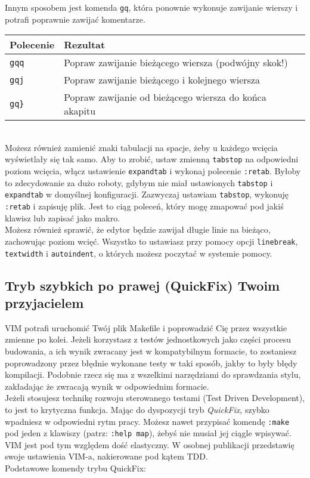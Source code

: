 \documentclass[a4paper,12pt]{article}
\begin{document}
\noindent
Innym sposobem jest komenda {\tt gq}, która ponownie wykonuje zawijanie wierszy i potrafi poprawnie zawijać komentarze.

\begin{tabular}{ l | p{} }
{\bf Polecenie} & {\bf Rezultat} \\ \hline
{\tt gqq} & Popraw zawijanie bieżącego wiersza (podwójny skok!)\\
{\tt gqj} & Popraw zawijanie bieżącego i kolejnego wiersza \\
{\tt gq\}} & Popraw zawijanie od bieżącego wiersza do końca akapitu \\ \hline
\end{tabular}\\ 

\noindent
Możesz również zamienić znaki tabulacji na spacje, żeby u każdego wcięcia wyświetlały się tak samo. Aby to zrobić, ustaw zmienną {\tt tabstop} na odpowiedni poziom wcięcia, włącz ustawienie {\tt expandtab} i wykonaj polecenie {\tt :retab}. Byłoby to zdecydowanie za dużo roboty, gdybym nie miał ustawionych {\tt tabstop} i {\tt expandtab} w domyślnej konfiguracji. Zazwyczaj ustawiam {\tt tabstop}, wykonuję {\tt :retab} i zapisuję plik. Jest to ciąg poleceń, który mogę zmapować pod jakiś klawisz lub zapisać jako makro.\\
Możesz również sprawić, że edytor będzie zawijał długie linie na bieżąco, zachowując poziom wcięć. Wszystko to ustawiasz przy pomocy opcji {\tt linebreak}, {\tt textwidth} i {\tt autoindent}, o których możesz poczytać w systemie pomocy.\\
\subsection{Tryb szybkich po prawej (QuickFix) Twoim przyjacielem}
VIM potrafi uruchomić Twój plik Makefile i poprowadzić Cię przez wszystkie zmienne po kolei. Jeżeli korzystasz z testów jednostkowych jako części procesu budowania, a ich wynik zwracany jest w kompatybilnym formacie, to zostaniesz poprowadzony przez błędnie wykonane testy w taki sposób, jakby to były błędy kompilacji. Podobnie rzecz się ma z wszelkimi narzędziami do sprawdzania stylu, zakładając że zwracają wynik w odpowiednim formacie.\\
Jeżeli stosujesz technikę rozwoju sterowanego testami (Test Driven Development), to jest to krytyczna funkcja. Mając do dyspozycji tryb {\it QuickFix}, szybko wpadniesz w odpowiedni rytm pracy. Możesz nawet przypisać komendę {\tt :make} pod jeden z klawiszy (patrz: {\tt :help map}), żebyś nie musiał jej ciągle wpisywać. VIM jest pod tym względem dość elastyczny. W osobnej publikacji przedstawię swoje ustawienia VIM-a, nakierowane pod kątem TDD.\\
Podstawowe komendy trybu QuickFix:
\end{document}
